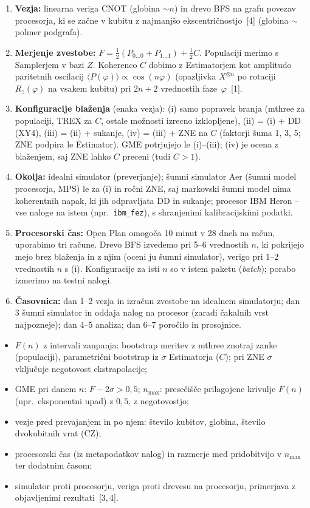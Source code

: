 \documentclass[10pt,a4paper]{article}
\newcommand{\sect}[1]{\par\vspace{4pt}{\normalsize\bfseries #1}\par\vspace{1pt}}
\newcommand{\nmax}{n_{\mathrm{max}}}
\begin{document}
\sect{Načrt poskusov}
\begin{enumerate}
\item \textbf{Vezja:} linearna veriga CNOT (globina $\sim n$) in drevo BFS na grafu povezav procesorja, ki se začne v kubitu z najmanjšo ekscentričnostjo~[4] (globina $\sim$ polmer podgrafa).
\item \textbf{Merjenje zvestobe:} $F=\frac{1}{2}(P_{0\ldots0}+P_{1\ldots1})+\frac{1}{2}C$.
Populaciji merimo s Samplerjem v bazi $Z$.
Koherenco $C$ dobimo z Estimatorjem kot amplitudo paritetnih oscilacij $\langle P(\varphi)\rangle\propto\cos(n\varphi)$ (opazljivka $X^{\otimes n}$ po rotaciji $R_z(\varphi)$ na vsakem kubitu) pri $2n+2$ vrednostih faze~$\varphi$~[1].
\item \textbf{Konfiguracije blaženja} (enaka vezja): (i) samo popravek branja (mthree za populaciji, TREX za $C$, ostale možnosti izrecno izklopljene), (ii) = (i) + DD (XY4), (iii) = (ii) + sukanje, (iv) = (iii) + ZNE na $C$ (faktorji šuma 1, 3, 5; ZNE podpira le Estimator).
GME potrjujejo le (i)--(iii); (iv) je ocena z blaženjem, saj ZNE lahko $C$ preceni (tudi $C>1$).
\item \textbf{Okolja:} idealni simulator (preverjanje); šumni simulator Aer (šumni model procesorja, MPS) le za (i) in ročni ZNE, saj markovski šumni model nima koherentnih napak, ki jih odpravljata DD in sukanje; procesor IBM Heron -- vse naloge na istem (npr.\ \texttt{ibm\_fez}), s shranjenimi kalibracijskimi podatki.
\item \textbf{Procesorski čas:} Open Plan omogoča 10 minut v 28 dneh na račun, uporabimo tri račune. Drevo BFS izvedemo pri 5--6 vrednostih $n$, ki pokrijejo mejo brez blaženja in z njim (oceni ju šumni simulator), verigo pri 1--2 vrednostih $n$ s (i). Konfiguracije za isti $n$ so v istem paketu (\emph{batch}); porabo izmerimo na testni nalogi.
\item \textbf{Časovnica:} dan 1--2 vezja in izračun zvestobe na idealnem simulatorju; dan 3 šumni simulator in oddaja nalog na procesor (zaradi čakalnih vrst najpozneje); dan 4--5 analiza; dan 6--7 poročilo in prosojnice.
\end{enumerate}

\sect{Metrike}
\begin{itemize}
\item $F(n)$ z intervali zaupanja: bootstrap meritev z mthree znotraj zanke (populaciji), parametrični bootstrap iz $\sigma$ Estimatorja ($C$); pri ZNE $\sigma$ vključuje negotovost ekstrapolacije;
\item GME pri danem $n$: $F-2\sigma>0{,}5$; $\nmax$: presečišče prilagojene krivulje $F(n)$ (npr.\ eksponentni upad) z $0{,}5$, z negotovostjo;
\item vezje pred prevajanjem in po njem: število kubitov, globina, število dvokubitnih vrat (CZ);
\item procesorski čas (iz metapodatkov nalog) in razmerje med pridobitvijo v $\nmax$ ter dodatnim časom;
\item simulator proti procesorju, veriga proti drevesu na procesorju, primerjava z objavljenimi rezultati~[3,\,4].
\end{itemize}
\end{document}
